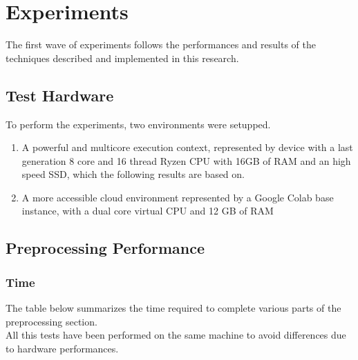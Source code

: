 \documentclass[
	letterpaper, %
	10pt, %
]{class}
\begin{document}



\section{Experiments}

The first wave of experiments follows the performances and results of the techniques described and implemented in this research.

\subsection{Test Hardware}

To perform the experiments, two environments were setupped.
\begin{enumerate}
    \item A powerful and multicore execution context, represented by device with a last generation 8 core and 16 thread Ryzen CPU with 16GB of RAM and an high speed SSD, which the following results are based on.
    \item A more accessible cloud environment represented by a Google Colab base instance, with a dual core virtual CPU and 12 GB of RAM
\end{enumerate}

\subsection{Preprocessing Performance}
\subsubsection{Time}
The table below summarizes the time required to complete various parts of the preprocessing section.\\
All this tests have been performed on the same machine to avoid differences due to hardware performances.
\end{document}
